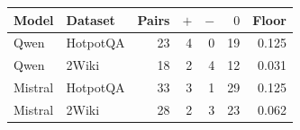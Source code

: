 \begin{tabular}{@{}llrrrrr@{}}
\toprule
Model & Dataset & Pairs & $+$ & $-$ & $0$ & Floor \\
\midrule
Qwen & HotpotQA & 23 & 4 & 0 & 19 & 0.125 \\
Qwen & 2Wiki & 18 & 2 & 4 & 12 & 0.031 \\
Mistral & HotpotQA & 33 & 3 & 1 & 29 & 0.125 \\
Mistral & 2Wiki & 28 & 2 & 3 & 23 & 0.062 \\
\bottomrule
\end{tabular}
